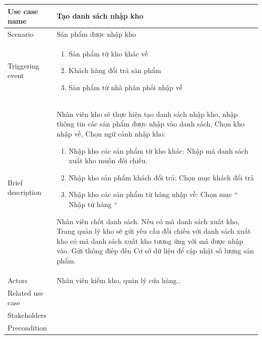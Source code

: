 \documentclass{article}
\begin{document}
\begin{tabular}{|m{4cm}|m{12cm}|}
		\hline
		Use case name & Tạo danh sách nhập kho \\
		\hline
		Scenario & Sản phẩm được nhập kho \\
		\hline
		Triggering event & \begin{enumerate}
		    \item Sản phẩm từ kho khác về
        	\item Khách hàng đổi trả sản phẩm
            \item Sản phẩm từ nhà phân phối nhập về

	    \end{enumerate}\\
		\hline
		Brief description & Nhân viên kho sẽ thực hiện tạo danh sách nhập kho, nhập thông tin các sản phẩm được nhập vào danh sách, Chọn kho nhập về, Chọn ngữ cảnh nhập kho:
		
		\begin{enumerate}
		    \item Nhập kho các sản phẩm từ kho khác:  Nhập mã danh sách xuất kho muốn đối chiếu.
        	\item Nhập kho sản phẩm khách đổi trả: Chọn mục khách đổi trả
            \item Nhập kho các sản phẩm từ hãng nhập về: Chọn mục “ Nhập từ hãng “
        \end{enumerate}
        Nhân viên chốt danh sách. Nếu có mã danh sách xuất kho, Trang quản lý kho sẽ gửi yêu cầu đối chiếu với danh sách xuất kho có mã danh sách xuất kho tương ứng với mã được nhập vào.
        Gửi thông điêp đến Cơ sở dữ liệu để cập nhật số lượng sản phẩm. \\

		\hline
		 Actors & Nhân viên kiểm kho, quản lý cửa hàng..\\
		\hline
		Related use case &  \\
		\hline
		Stakeholders & \\
		\hline
		Precondition &\\
		\hline
	\end{tabular}
    
\end{document}
